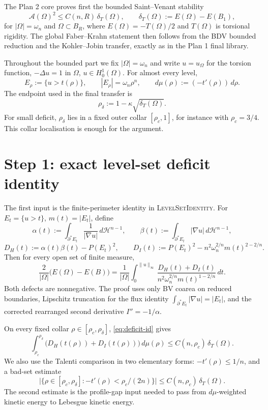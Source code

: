 \documentclass[11pt]{article}
\theoremstyle{definition}
\newcommand{\Om}{\Omega}
\newcommand{\Fr}{\mathcal A}
\newcommand{\rdel}{\rho_\delta}
\begin{document}
The Plan 2 core proves first the bounded Saint--Venant stability
\begin{equation}\label{eq:SVbounded}
  \Fr(\Om)^2\le C(n,R)\,\delta_T(\Om),
  \qquad
  \delta_T(\Om):=E(\Om)-E(B_1),
\end{equation}
for $|\Om|=\omega_n$ and $\Om\subset B_R$, where
$E(\Om)=-T(\Om)/2$ and $T(\Om)$ is torsional rigidity.  The global
Faber--Krahn statement then follows from the BDV bounded reduction and
the Kohler--Jobin transfer, exactly as in the Plan 1 final library.

Throughout the bounded part we fix $|\Om|=\omega_n$ and write
$u=u_\Om$ for the torsion function, $-\Delta u=1$ in $\Om$,
$u\in H^1_0(\Om)$.  For almost every level,
\[
  E_\rho:=\{u>t(\rho)\},\qquad |E_\rho|=\omega_n\rho^n,\qquad
  d\mu(\rho):=(-t'(\rho))\,d\rho .
\]
The endpoint used in the final transfer is
\begin{equation}\label{eq:rho-delta}
  \rdel:=1-\kappa\sqrt{\delta_T(\Om)} .
\end{equation}
For small deficit, $\rdel$ lies in a fixed outer collar
$[\rho_c,1]$, for instance with $\rho_c=3/4$.  This collar localisation
is enough for the argument.

\section{Step 1: exact level-set deficit identity}

The first input is the finite-perimeter identity in
\textsc{LevelSetIdentity}.  For $E_t=\{u>t\}$, $m(t)=|E_t|$, define
\[
  \alpha(t):=\int_{\partial^*E_t}\frac{1}{|\nabla u|}\,d\mathcal H^{n-1},
  \qquad
  \beta(t):=\int_{\partial^*E_t}|\nabla u|\,d\mathcal H^{n-1},
\]
\[
  D_H(t):=\alpha(t)\beta(t)-P(E_t)^2,\qquad
  D_I(t):=P(E_t)^2-n^2\omega_n^{2/n}m(t)^{2-2/n}.
\]
Then for every open set of finite measure,
\begin{equation}\label{eq:deficit-id}
  \frac{2}{|\Om|}\bigl(E(\Om)-E(B)\bigr)
  =
  \frac{1}{|\Om|}\int_0^{\|u\|_\infty}
  \frac{D_H(t)+D_I(t)}
  {n^2\omega_n^{2/n}m(t)^{1-2/n}}\,dt .
\end{equation}
Both defects are nonnegative.  The proof uses only BV coarea on
reduced boundaries, Lipschitz truncation for the flux identity
$\int_{\partial^*E_t}|\nabla u|=|E_t|$, and the corrected rearranged
second derivative $I''=-1/\alpha$.

On every fixed collar $\rho\in[\rho_c,\rdel]$, \eqref{eq:deficit-id}
gives
\begin{equation}\label{eq:DH-DI}
  \int_{\rho_c}^{\rdel}
  \bigl(D_H(t(\rho))+D_I(t(\rho))\bigr)\,d\mu(\rho)
  \le C(n,\rho_c)\,\delta_T(\Om).
\end{equation}
We also use the Talenti comparison in two elementary forms:
$-t'(\rho)\le 1/n$, and a bad-set estimate
\[
  \bigl|\{\rho\in[\rho_c,\rdel]:-t'(\rho)<\rho_c/(2n)\}\bigr|
  \le C(n,\rho_c)\,\delta_T(\Om).
\]
The second estimate is the profile-gap input needed to pass from
$d\mu$-weighted kinetic energy to Lebesgue kinetic energy.
\end{document}
